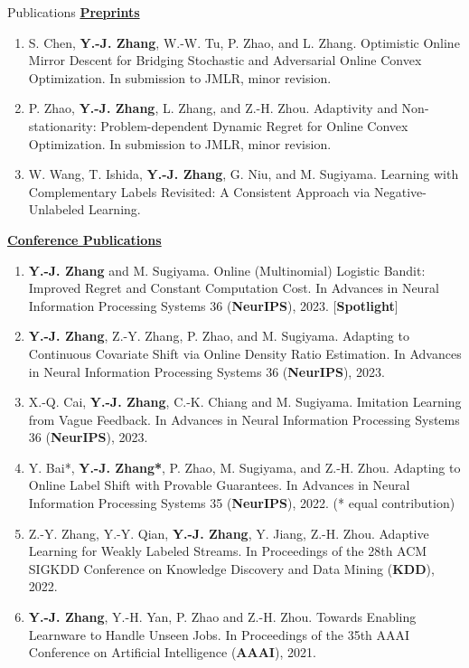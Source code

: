 \documentclass{resume} %
\begin{document}
\begin{rSection}{Publications}
\noindent \underline{\textbf{Preprints}}
\begin{enumerate}[leftmargin=*]
	\item S. Chen, \textbf{Y.-J. Zhang}, W.-W. Tu, P. Zhao, and L. Zhang. Optimistic Online Mirror Descent for Bridging Stochastic and Adversarial Online Convex Optimization. In submission to JMLR, minor revision. 
	\item P. Zhao, \textbf{Y.-J. Zhang}, L. Zhang, and Z.-H. Zhou. Adaptivity and Non-stationarity: Problem-dependent Dynamic Regret for Online Convex Optimization. In submission to JMLR, minor revision.
	\item W. Wang, T. Ishida, \textbf{Y.-J. Zhang}, G. Niu, and M. Sugiyama. Learning with Complementary Labels Revisited: A Consistent Approach via Negative-Unlabeled Learning.	
\end{enumerate}
\noindent \underline{\textbf{Conference Publications}}
\begin{enumerate}[leftmargin=*]
	\item \textbf{Y.-J. Zhang} and M. Sugiyama. Online (Multinomial) Logistic Bandit: Improved Regret and Constant Computation Cost. In {Advances in Neural Information Processing Systems 36} (\textbf{NeurIPS}), 2023. [\textbf{Spotlight}]
	\item \textbf{Y.-J. Zhang}, Z.-Y. Zhang, P. Zhao, and M. Sugiyama. Adapting to Continuous Covariate Shift via Online Density Ratio Estimation. In {Advances in Neural Information Processing Systems 36} (\textbf{NeurIPS}), 2023.
	\item X.-Q. Cai, \textbf{Y.-J. Zhang}, C.-K. Chiang and M. Sugiyama. Imitation Learning from Vague Feedback. In {Advances in Neural Information Processing Systems 36} (\textbf{NeurIPS}), 2023.
	\item Y. Bai*, \textbf{Y.-J. Zhang*}, P. Zhao, M. Sugiyama, and Z.-H. Zhou. Adapting to Online Label Shift with Provable Guarantees. In {Advances in Neural Information Processing Systems 35} (\textbf{NeurIPS}), 2022.  (* equal contribution)
	\item Z.-Y. Zhang, Y.-Y. Qian, \textbf{Y.-J. Zhang}, Y. Jiang, Z.-H. Zhou. Adaptive Learning for Weakly Labeled Streams. In {Proceedings of the 28th ACM SIGKDD Conference on Knowledge Discovery and Data Mining} (\textbf{KDD}), 2022.
	\item \textbf{Y.-J. Zhang}, Y.-H. Yan, P. Zhao and Z.-H. Zhou. Towards Enabling Learnware to Handle Unseen Jobs. In {Proceedings of the 35th AAAI Conference on Artificial Intelligence} (\textbf{AAAI}), 2021.

\end{enumerate}
\end{rSection}
\end{document}
